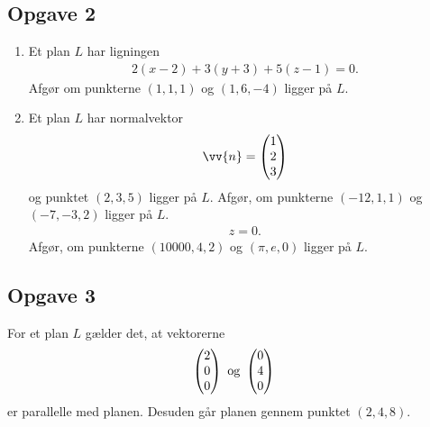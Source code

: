 \subsection*{Opgave 2}
\begin{enumerate}[label=\roman*)]
	\item Et plan $L$ har ligningen
	\begin{align*}
		2(x-2) + 3(y+3) +5(z-1) = 0.
	\end{align*}
	Afgør om punkterne $(1,1,1)$ og $(1,6,-4)$ ligger på $L$. 
	\item Et plan $L$ har normalvektor 
	\begin{align*}
		\vv{n} =
		\begin{pmatrix}
			1 \\ 2 \\ 3
		\end{pmatrix}
	\end{align*}	 
	og punktet $(2,3,5)$ ligger på $L$. 
	Afgør, om punkterne $(-12,1,1)$ og $(-7,-3,2)$ ligger på $L$.
	\begin{align*}
		z=0.
	\end{align*}
	Afgør, om punkterne $(10000,4,2)$ og $(\pi, e,0)$ ligger på $L$.
\end{enumerate}

\subsection*{Opgave 3}
For et plan $L$ gælder det, at vektorerne 
\begin{align*}
	\begin{pmatrix}
		2 \\ 0 \\ 0
	\end{pmatrix}
	\textnormal{ og } 
	\begin{pmatrix}
		0 \\ 4 \\ 0
	\end{pmatrix}
\end{align*}
 er parallelle med planen. Desuden går planen gennem punktet $(2,4,8)$.


